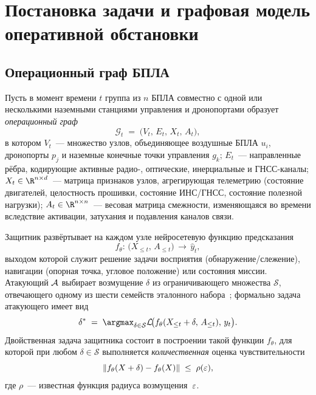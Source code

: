 \section{Постановка задачи и графовая модель оперативной обстановки}
\label{sec:uav_problem}

\subsection{Операционный граф БПЛА}

Пусть в момент времени $t$ группа из $n$ БПЛА совместно с одной или
несколькими наземными станциями управления и дронопортами образует
\emph{операционный граф}
\begin{equation}
\mathcal{G}_t \;=\; \bigl(V_t,\,E_t,\,X_t,\,A_t\bigr),
\label{eq:uav_graph}
\end{equation}
в котором $V_t$~--- множество узлов, объединяющее воздушные БПЛА
$u_i$, дронопорты $p_j$ и наземные конечные точки управления $g_k$;
$E_t$~--- направленные рёбра, кодирующие активные радио-, оптические,
инерциальные и ГНСС-каналы; $X_t \in \R^{n\times d}$~--- матрица
признаков узлов, агрегирующая телеметрию (состояние двигателей,
целостность прошивки, состояние ИНС/ГНСС, состояние полезной нагрузки);
$A_t \in \R^{n\times n}$~--- весовая матрица смежности, изменяющаяся во
времени вследствие активации, затухания и подавления каналов связи.

Защитник развёртывает на каждом узле нейросетевую функцию предсказания
\begin{equation}
f_{\theta}\!\colon\,\bigl(X_{\le t},\,A_{\le t}\bigr) \,\longrightarrow\,
\hat{y}_t,
\end{equation}
выходом которой служит решение задачи восприятия (обнаружение/слежение),
навигации (опорная точка, угловое положение) или состояния миссии.
Атакующий $\mathcal{A}$ выбирает возмущение $\delta$ из ограничивающего
множества $\mathcal{S}$, отвечающего одному из шести семейств эталонного
набора~\cite{uav_proposal_2026}; формально задача атакующего имеет вид
\begin{equation}
\delta^{*} \;=\; \argmax_{\delta\in\mathcal{S}}
\Loss\!\bigl(f_{\theta}(X_{\le t}+\delta,\,A_{\le t}),\,y_t\bigr).
\label{eq:uav_advmax}
\end{equation}
Двойственная задача защитника состоит в построении такой функции
$f_{\theta}$, для которой при любом $\delta\in\mathcal{S}$ выполняется
\emph{количественная} оценка чувствительности
\begin{equation}
\left\lVert f_{\theta}(X+\delta) - f_{\theta}(X)\right\rVert \;\le\; \rho(\varepsilon),
\label{eq:uav_cert}
\end{equation}
где $\rho$~--- известная функция радиуса возмущения~$\varepsilon$.

